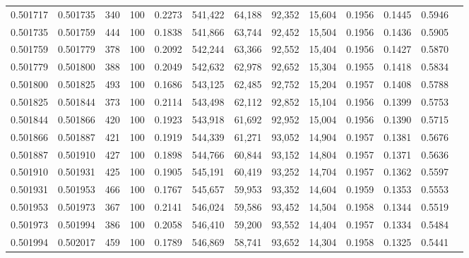 \begin{tabular}{rrrrrrrrrrrrr}
0.501717 & 0.501735 &   340 & 100 &                                     0.2273 & 541,422 &  64,188 &  92,352 &  15,604 & 0.1956 & 0.1445 & 0.5946 \\
0.501735 & 0.501759 &   444 & 100 &                                     0.1838 & 541,866 &  63,744 &  92,452 &  15,504 & 0.1956 & 0.1436 & 0.5905 \\
0.501759 & 0.501779 &   378 & 100 &                                     0.2092 & 542,244 &  63,366 &  92,552 &  15,404 & 0.1956 & 0.1427 & 0.5870 \\
0.501779 & 0.501800 &   388 & 100 &                                     0.2049 & 542,632 &  62,978 &  92,652 &  15,304 & 0.1955 & 0.1418 & 0.5834 \\
0.501800 & 0.501825 &   493 & 100 &                                     0.1686 & 543,125 &  62,485 &  92,752 &  15,204 & 0.1957 & 0.1408 & 0.5788 \\
0.501825 & 0.501844 &   373 & 100 &                                     0.2114 & 543,498 &  62,112 &  92,852 &  15,104 & 0.1956 & 0.1399 & 0.5753 \\
0.501844 & 0.501866 &   420 & 100 &                                     0.1923 & 543,918 &  61,692 &  92,952 &  15,004 & 0.1956 & 0.1390 & 0.5715 \\
0.501866 & 0.501887 &   421 & 100 &                                     0.1919 & 544,339 &  61,271 &  93,052 &  14,904 & 0.1957 & 0.1381 & 0.5676 \\
0.501887 & 0.501910 &   427 & 100 &                                     0.1898 & 544,766 &  60,844 &  93,152 &  14,804 & 0.1957 & 0.1371 & 0.5636 \\
0.501910 & 0.501931 &   425 & 100 &                                     0.1905 & 545,191 &  60,419 &  93,252 &  14,704 & 0.1957 & 0.1362 & 0.5597 \\
0.501931 & 0.501953 &   466 & 100 &                                     0.1767 & 545,657 &  59,953 &  93,352 &  14,604 & 0.1959 & 0.1353 & 0.5553 \\
0.501953 & 0.501973 &   367 & 100 &                                     0.2141 & 546,024 &  59,586 &  93,452 &  14,504 & 0.1958 & 0.1344 & 0.5519 \\
0.501973 & 0.501994 &   386 & 100 &                                     0.2058 & 546,410 &  59,200 &  93,552 &  14,404 & 0.1957 & 0.1334 & 0.5484 \\
0.501994 & 0.502017 &   459 & 100 &                                     0.1789 & 546,869 &  58,741 &  93,652 &  14,304 & 0.1958 & 0.1325 & 0.5441 \\

\end{tabular}
